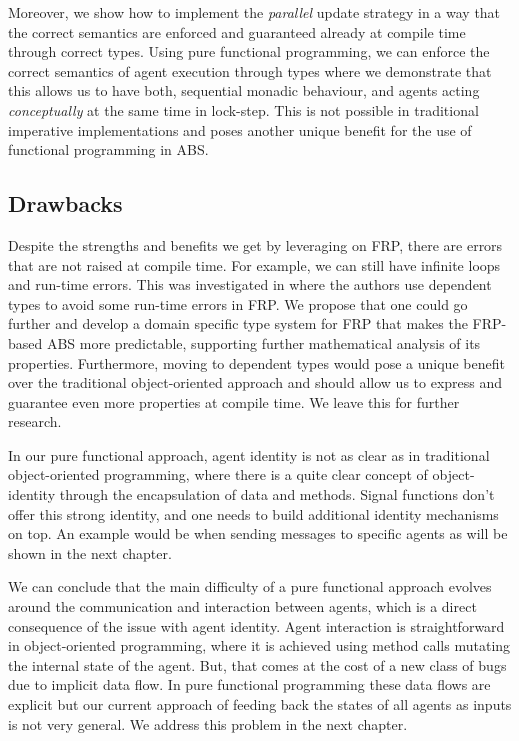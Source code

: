 Moreover, we show how to implement the \textit{parallel} update strategy \cite{thaler_art_2017} in a way that the correct semantics are enforced and guaranteed already at compile time through correct types. Using pure functional programming, we can enforce the correct semantics of agent execution through types where we demonstrate that this allows us to have both, sequential monadic behaviour, and agents acting \textit{conceptually} at the same time in lock-step. This is not possible in traditional imperative implementations and poses another unique benefit for the use of functional programming in ABS.

\subsection{Drawbacks}
Despite the strengths and benefits we get by leveraging on FRP, there are errors that are not raised at compile time. For example, we can still have infinite loops and run-time errors. This was investigated in \cite{sculthorpe_safe_2009} where the authors use dependent types to avoid some run-time errors in FRP. We propose that one could go further and develop a domain specific type system for FRP that makes the FRP-based ABS more predictable, supporting further mathematical analysis of its properties. Furthermore, moving to dependent types would pose a unique benefit over the traditional object-oriented approach and should allow us to express and guarantee even more properties at compile time. We leave this for further research.

In our pure functional approach, agent identity is not as clear as in traditional object-oriented programming, where there is a quite clear concept of object-identity through the encapsulation of data and methods. Signal functions don't offer this strong identity, and one needs to build additional identity mechanisms on top. An example would be when sending messages to specific agents as will be shown in the next chapter.

We can conclude that the main difficulty of a pure functional approach evolves around the communication and interaction between agents, which is a direct consequence of the issue with agent identity. Agent interaction is straightforward in object-oriented programming, where it is achieved using method calls mutating the internal state of the agent. But, that comes at the cost of a new class of bugs due to implicit data flow. In pure functional programming these data flows are explicit but our current approach of feeding back the states of all agents as inputs is not very general. We address this problem in the next chapter.

